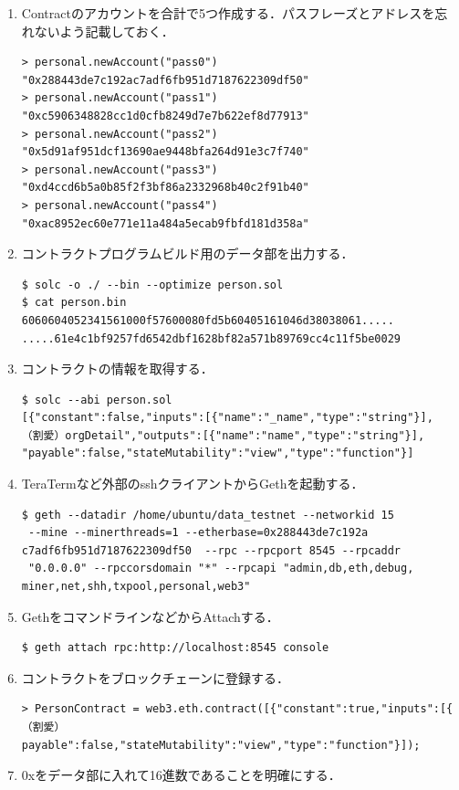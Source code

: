 \newpage
\begin{enumerate}
\item Contractのアカウントを合計で5つ作成する．パスフレーズとアドレスを忘れないよう記載しておく．
\begin{verbatim}
> personal.newAccount("pass0")
"0x288443de7c192ac7adf6fb951d7187622309df50"
> personal.newAccount("pass1")
"0xc5906348828cc1d0cfb8249d7e7b622ef8d77913"
> personal.newAccount("pass2")
"0x5d91af951dcf13690ae9448bfa264d91e3c7f740"
> personal.newAccount("pass3")
"0xd4ccd6b5a0b85f2f3bf86a2332968b40c2f91b40"
> personal.newAccount("pass4")
"0xac8952ec60e771e11a484a5ecab9fbfd181d358a"
\end{verbatim}
\item コントラクトプログラムビルド用のデータ部を出力する．
\begin{verbatim}
$ solc -o ./ --bin --optimize person.sol
$ cat person.bin
6060604052341561000f57600080fd5b60405161046d38038061.....
.....61e4c1bf9257fd6542dbf1628bf82a571b89769cc4c11f5be0029
\end{verbatim}
\item コントラクトの情報を取得する．
\begin{verbatim}
$ solc --abi person.sol
[{"constant":false,"inputs":[{"name":"_name","type":"string"}],
（割愛）orgDetail","outputs":[{"name":"name","type":"string"}],
"payable":false,"stateMutability":"view","type":"function"}]
\end{verbatim}
\item TeraTermなど外部のsshクライアントからGethを起動する．
\begin{verbatim}
$ geth --datadir /home/ubuntu/data_testnet --networkid 15
 --mine --minerthreads=1 --etherbase=0x288443de7c192a
c7adf6fb951d7187622309df50  --rpc --rpcport 8545 --rpcaddr
 "0.0.0.0" --rpccorsdomain "*" --rpcapi "admin,db,eth,debug,
miner,net,shh,txpool,personal,web3"
\end{verbatim}
\item GethをコマンドラインなどからAttachする．
\begin{verbatim}
$ geth attach rpc:http://localhost:8545 console
\end{verbatim}
\item コントラクトをブロックチェーンに登録する．
\begin{verbatim}
> PersonContract = web3.eth.contract([{"constant":true,"inputs":[{
（割愛）payable":false,"stateMutability":"view","type":"function"}]);
\end{verbatim}
\newpage
\item 0xをデータ部に入れて16進数であることを明確にする．

\end{enumerate}
